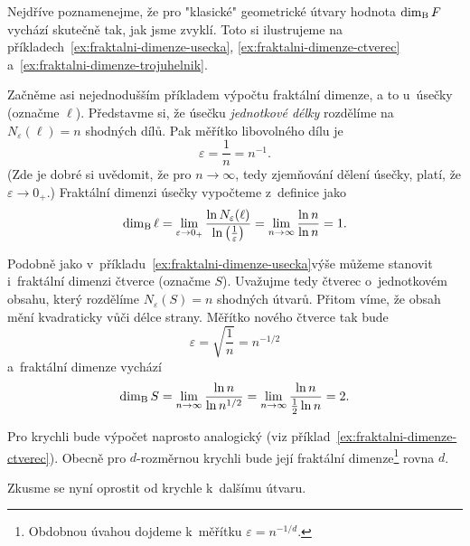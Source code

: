 Nejdříve poznamenejme, že pro "klasické" geometrické útvary hodnota $\operatorname{dim_B}{F}$ vychází skutečně tak, jak jsme zvyklí. Toto si ilustrujeme na příkladech~\ref{ex:fraktalni-dimenze-usecka}, \ref{ex:fraktalni-dimenze-ctverec} a~\ref{ex:fraktalni-dimenze-trojuhelnik}.
\begin{example}\label{ex:fraktalni-dimenze-usecka}
    Začněme asi nejednodušším příkladem výpočtu fraktální dimenze, a to u~úsečky (označme $\ell$). Představme si, že úsečku \emph{jednotkové délky} rozdělíme na $N_\varepsilon(\ell)=n$ shodných dílů. Pak měřítko libovolného dílu je
    \[\varepsilon=\dfrac{1}{n}=n^{-1}.\]
    (Zde je dobré si uvědomit, že pro $n\to\infty$, tedy zjemňování dělení úsečky, platí, že $\varepsilon\to 0_+$.) Fraktální dimenzi úsečky vypočteme z~definice jako
    \[\operatorname{dim_B}{\ell}=\lim_{\varepsilon\to 0_+}{\dfrac{\ln{N_\varepsilon(\ell)}}{\ln{\left(\frac{1}{\varepsilon}\right)}}}=\lim_{n\to\infty}{\dfrac{\ln{n}}{\ln{n}}}=1.\]
\end{example}
\begin{example}\label{ex:fraktalni-dimenze-ctverec}
    Podobně jako v~příkladu~\ref{ex:fraktalni-dimenze-usecka}\linebreak{}výše můžeme stanovit i~fraktální dimenzi čtverce (označme $S$). Uvažujme tedy čtverec o~jednotkovém obsahu, který rozdělíme $N_\varepsilon(S)=n$ shodných útvarů. Přitom víme, že obsah mění kvadraticky vůči délce strany. Měřítko nového čtverce tak bude
    \[\varepsilon=\sqrt{\dfrac{1}{n}}=n^{-1/2}\]
    a~fraktální dimenze vychází
    \[\operatorname{dim_B}{S}=\lim_{n\to\infty}{\dfrac{\ln{n}}{\ln{n^{1/2}}}}=\lim_{n\to\infty}{\dfrac{\ln{n}}{\frac{1}{2}\ln{n}}}=2.\]
\end{example}
Pro krychli bude výpočet naprosto analogický (viz příklad~\ref{ex:fraktalni-dimenze-ctverec}). Obecně pro $d$-rozměrnou krychli bude její fraktální dimenze\footnote{Obdobnou úvahou dojdeme k~měřítku $\varepsilon=n^{-1/d}$.} rovna $d$.\par
Zkusme se nyní oprostit od krychle k~dalšímu útvaru.
